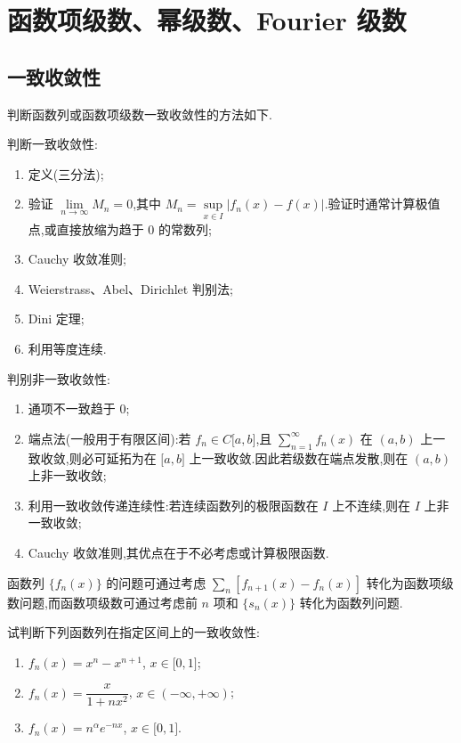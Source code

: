 \documentclass[../数学分析培优讲义.tex]{subfiles}
\begin{document}
\setcounter{chapter}{8}
\pagestyle{fancy}

\chapter{函数项级数、幂级数、Fourier 级数}


\section{一致收敛性}

判断函数列或函数项级数一致收敛性的方法如下.

判断一致收敛性:
\begin{enumerate}[label=\textcircled{\arabic*},leftmargin=2.2em]
    \item 定义(三分法);
    \item 验证 $\displaystyle\lim\limits_{n\to\infty}M_n=0$,其中
    $M_n=\displaystyle\sup\limits_{x\in I}|f_n(x)-f(x)|$.验证时通常计算极值点,或直接放缩为趋于 $0$ 的常数列;
    \item Cauchy 收敛准则;
    \item Weierstrass、Abel、Dirichlet 判别法;
    \item Dini 定理;
    \item 利用等度连续.
\end{enumerate}

判别非一致收敛性:
\begin{enumerate}[label=\textcircled{\arabic*},leftmargin=2.2em]
    \item 通项不一致趋于 $0$;
    \item 端点法(一般用于有限区间):若 $f_n\in C\lbrack a,b\rbrack$,且 $\displaystyle\sum\limits_{n=1}^{\infty}f_n(x)$ 在 $(a,b)$ 上一致收敛,则必可延拓为在 $\lbrack a,b\rbrack$ 上一致收敛.因此若级数在端点发散,则在 $(a,b)$ 上非一致收敛;
    \item 利用一致收敛传递连续性:若连续函数列的极限函数在 $I$ 上不连续,则在 $I$ 上非一致收敛;
    \item Cauchy 收敛准则,其优点在于不必考虑或计算极限函数.
\end{enumerate}

\begin{remark}
函数列 $\{f_n(x)\}$ 的问题可通过考虑 $\displaystyle\sum\limits_n[f_{n+1}(x)-f_n(x)]$ 转化为函数项级数问题,而函数项级数可通过考虑前 $n$ 项和 $\{s_n(x)\}$ 转化为函数列问题.
\end{remark}

\begin{example}
试判断下列函数列在指定区间上的一致收敛性:
\begin{enumerate}[label=(\arabic*)]
    \item $f_n(x)=x^n-x^{n+1}$, $x\in\lbrack 0,1\rbrack$;
    \item $f_n(x)=\dfrac{x}{1+nx^2}$, $x\in(-\infty,+\infty)$;
    \item $f_n(x)=n^\alpha e^{-nx}$, $x\in\lbrack 0,1\rbrack$.
\end{enumerate}
\end{example}
\exampleblank
\end{document}
